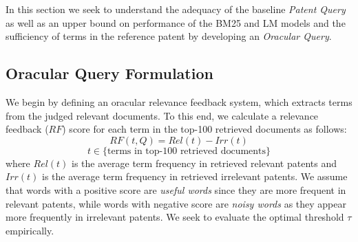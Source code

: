 %

In this section we seek to understand the adequacy of the baseline
\emph{Patent Query} as well as an upper bound on performance of the
BM25 and LM models and the sufficiency of terms in the reference patent 
by developing an \emph{Oracular Query}.

\subsection{Oracular Query Formulation}

We begin by defining an oracular relevance feedback system, which
extracts terms from the judged relevant documents.  To this end, we
calculate a relevance feedback ($\mathit{RF}$) score for each term in the top-100
retrieved documents as follows:
\begin{equation}
RF(t,Q)=Rel(t)-Irr(t) 
 \label{eq:score}
\end{equation}\vspace*{-5ex}
\begin{displaymath}t\in \lbrace \mbox{terms in top-100 retrieved documents}\rbrace\end{displaymath}
where $ Rel(t) $ is the average term frequency in retrieved relevant patents and $ Irr(t) $ is the average term frequency in retrieved irrelevant patents. We assume that words with a positive score are {\em useful words} since they are more frequent in relevant patents, while words with negative score are {\em noisy words} as they appear more frequently in irrelevant patents.  We seek to evaluate the optimal threshold $\tau$ empirically.

